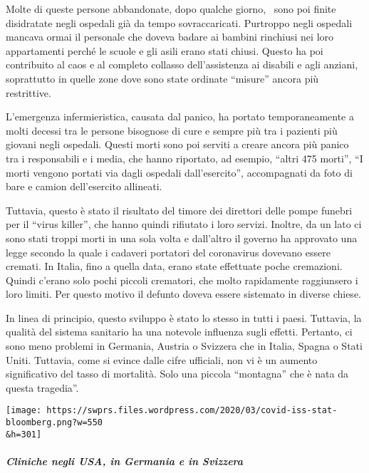 Molte di queste persone abbandonate, dopo qualche giorno,~ sono poi
finite disidratate negli ospedali già da tempo sovraccaricati. Purtroppo
negli ospedali mancava ormai il personale che doveva badare ai bambini
rinchiusi nei loro appartamenti perché le scuole e gli asili erano stati
chiusi. Questo ha poi contribuito al caos e al completo collasso
dell'assistenza ai disabili e agli anziani, soprattutto in quelle zone
dove sono state ordinate ``misure'' ancora più restrittive.

L'emergenza infermieristica, causata dal panico, ha portato
temporaneamente a molti decessi tra le persone bisognose di cure e
sempre più tra i pazienti più giovani negli ospedali. Questi morti sono
poi serviti a creare ancora più panico tra i responsabili e i media, che
hanno riportato, ad esempio, ``altri 475 morti'', ``I morti vengono
portati via dagli ospedali dall'esercito'', accompagnati da foto di bare
e camion dell'esercito allineati.

Tuttavia, questo è stato il risultato del timore dei direttori delle
pompe funebri per il ``virus killer'', che hanno quindi rifiutato i loro
servizi. Inoltre, da un lato ci sono stati troppi morti in una sola
volta e dall'altro il governo ha approvato una legge secondo la quale i
cadaveri portatori del coronavirus dovevano essere cremati. In Italia,
fino a quella data, erano state effettuate poche cremazioni. Quindi
c'erano solo pochi piccoli crematori, che molto rapidamente raggiunsero
i loro limiti. Per questo motivo il defunto doveva essere sistemato in
diverse chiese.

In linea di principio, questo sviluppo è stato lo stesso in tutti i
paesi. Tuttavia, la qualità del sistema sanitario ha una notevole
influenza sugli effetti. Pertanto, ci sono meno problemi in Germania,
Austria o Svizzera che in Italia, Spagna o Stati Uniti. Tuttavia, come
si evince dalle cifre ufficiali, non vi è un aumento significativo del
tasso di mortalità. Solo una piccola ``montagna'' che è nata da questa
tragedia''.

\texttt{[image: https://swprs.files.wordpress.com/2020/03/covid-iss-stat-bloomberg.png?w=550\\\&h=301]}

\hypertarget{cliniche-negli-usa-in-germania-e-in-svizzera}{%
\subparagraph{\texorpdfstring{\textbf{Cliniche negli USA, in Germania e
in
Svizzera}}{Cliniche negli USA, in Germania e in Svizzera}}\label{cliniche-negli-usa-in-germania-e-in-svizzera}}

